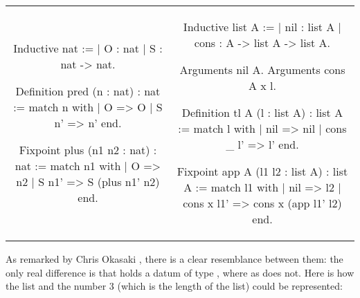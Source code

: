 \documentclass{article}
\newenvironment{no_padding_center}
    {\parskip=0pt\par\nopagebreak\centering}
    {\par\noindent}
\begin{document}
\begin{no_padding_center}
    \begin{tabular}{c c}
        \begin{coq}
Inductive nat :=
  | O : nat
  | S : nat -> nat.




Definition pred (n : nat) : nat :=
  match n with
  | O => O
  | S n' => n'
  end.

Fixpoint plus (n1 n2 : nat) : nat :=
  match n1 with
  | O => n2
  | S n1' => S (plus n1' n2)
  end.
        \end{coq} &
        \begin{coq}
Inductive list A :=
  | nil : list A
  | cons : A -> list A -> list A.

Arguments nil {A}.
Arguments cons {A} x l.

Definition tl {A} (l : list A) : list A :=
  match l with
  | nil => nil
  | cons _ l' => l'
  end.

Fixpoint app {A} (l1 l2 : list A) : list A :=
  match l1 with
  | nil => l2
  | cons x l1' => cons x (app l1' l2)
  end.
        \end{coq}
    \end{tabular}
\end{no_padding_center}

As remarked by Chris Okasaki \cite{okasaki_1998}, there is a clear resemblance between them: the only real difference is that  holds a datum of type , where as  does not. Here is how the list \coqinline{[7; 5; 8]} and the number 3 (which is the length of the list) could be represented:

\begin{center}
\end{center}
\end{document}
